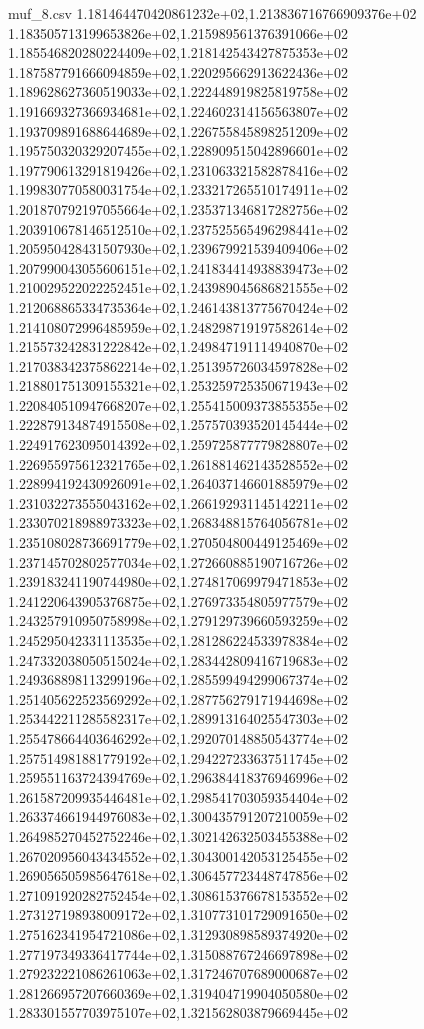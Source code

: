 \begin{filecontents*}{muf_8.csv}
1.181464470420861232e+02,1.213836716766909376e+02
1.183505713199653826e+02,1.215989561376391066e+02
1.185546820280224409e+02,1.218142543427875353e+02
1.187587791666094859e+02,1.220295662913622436e+02
1.189628627360519033e+02,1.222448919825819758e+02
1.191669327366934681e+02,1.224602314156563807e+02
1.193709891688644689e+02,1.226755845898251209e+02
1.195750320329207455e+02,1.228909515042896601e+02
1.197790613291819426e+02,1.231063321582878416e+02
1.199830770580031754e+02,1.233217265510174911e+02
1.201870792197055664e+02,1.235371346817282756e+02
1.203910678146512510e+02,1.237525565496298441e+02
1.205950428431507930e+02,1.239679921539409406e+02
1.207990043055606151e+02,1.241834414938839473e+02
1.210029522022252451e+02,1.243989045686821555e+02
1.212068865334735364e+02,1.246143813775670424e+02
1.214108072996485959e+02,1.248298719197582614e+02
1.215573242831222842e+02,1.249847191114940870e+02
1.217038342375862214e+02,1.251395726034597828e+02
1.218801751309155321e+02,1.253259725350671943e+02
1.220840510947668207e+02,1.255415009373855355e+02
1.222879134874915508e+02,1.257570393520145444e+02
1.224917623095014392e+02,1.259725877779828807e+02
1.226955975612321765e+02,1.261881462143528552e+02
1.228994192430926091e+02,1.264037146601885979e+02
1.231032273555043162e+02,1.266192931145142211e+02
1.233070218988973323e+02,1.268348815764056781e+02
1.235108028736691779e+02,1.270504800449125469e+02
1.237145702802577034e+02,1.272660885190716726e+02
1.239183241190744980e+02,1.274817069979471853e+02
1.241220643905376875e+02,1.276973354805977579e+02
1.243257910950758998e+02,1.279129739660593259e+02
1.245295042331113535e+02,1.281286224533978384e+02
1.247332038050515024e+02,1.283442809416719683e+02
1.249368898113299196e+02,1.285599494299067374e+02
1.251405622523569292e+02,1.287756279171944698e+02
1.253442211285582317e+02,1.289913164025547303e+02
1.255478664403646292e+02,1.292070148850543774e+02
1.257514981881779192e+02,1.294227233637511745e+02
1.259551163724394769e+02,1.296384418376946996e+02
1.261587209935446481e+02,1.298541703059354404e+02
1.263374661944976083e+02,1.300435791207210059e+02
1.264985270452752246e+02,1.302142632503455388e+02
1.267020956043434552e+02,1.304300142053125455e+02
1.269056505985647618e+02,1.306457723448747856e+02
1.271091920282752454e+02,1.308615376678153552e+02
1.273127198938009172e+02,1.310773101729091650e+02
1.275162341954721086e+02,1.312930898589374920e+02
1.277197349336417744e+02,1.315088767246697898e+02
1.279232221086261063e+02,1.317246707689000687e+02
1.281266957207660369e+02,1.319404719904050580e+02
1.283301557703975107e+02,1.321562803879669445e+02

\end{filecontents*}
